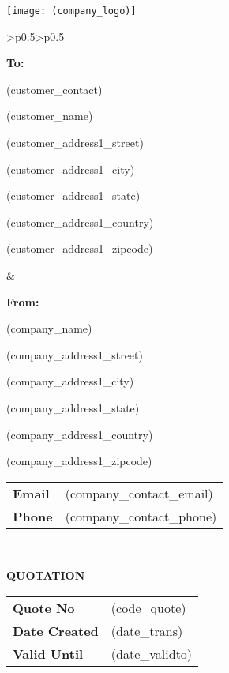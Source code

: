 \documentclass[english]{article}
\providecommand{\tabularnewline}{\\}
\begin{document}
\noindent \texttt{[image: (company\_logo)]}
		

\noindent \begin{tabular}{>{\centering}p{}>{\centering}p{}}
\noindent \begin{flushleft}
\textbf{To:}

(customer\_contact)

(customer\_name)


(customer\_address1\_street)

(customer\_address1\_city)

(customer\_address1\_state)

(customer\_address1\_country)

(customer\_address1\_zipcode)

\par\end{flushleft}
& \begin{flushleft}
\textbf{From:}

(company\_name)

(company\_address1\_street)

(company\_address1\_city)

(company\_address1\_state)

(company\_address1\_country)

(company\_address1\_zipcode)

\vspace{5mm}

\begin{tabular}{ll}
\textbf{Email} & (company\_contact\_email) \tabularnewline
\textbf{Phone} & (company\_contact\_phone) \tabularnewline
\end{tabular}

\par\end{flushleft}
\tabularnewline
\end{tabular}

\noindent \vspace{10mm}

\noindent \textbf{QUOTATION}

\noindent \vspace{10mm}


\noindent \begin{tabular}{ll}
\textbf{Quote No} & (code\_quote) \tabularnewline
\textbf{Date Created} & (date\_trans) \tabularnewline
\textbf{Valid Until} & (date\_validto) \tabularnewline
\end{tabular}
\end{document}
